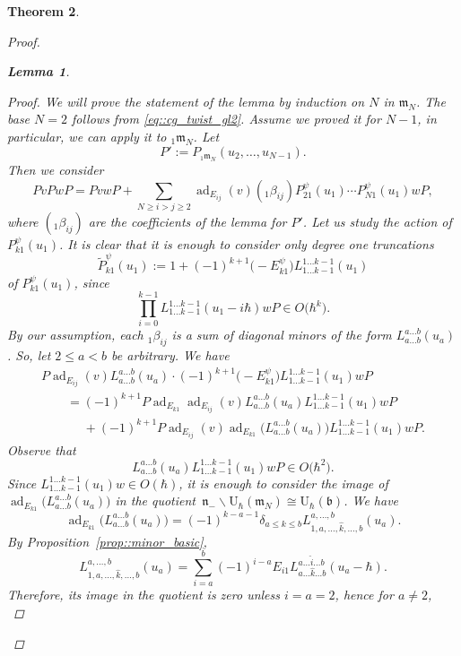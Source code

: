 \documentclass[10pt,a4paper]{amsart}
\numberwithin{equation}{section}
\newtheorem{Theorem}{Theorem}[section]
\newtheorem{Lemma}[Theorem]{Lemma}
\newcommand{\U}{\mathrm{U}_{\hbar}}
\renewcommand{\b}{\mathfrak{b}}
\newcommand{\n}{\mathfrak{n}}
\newcommand{\m}{\mathfrak{m}}
\DeclareMathOperator{\ad}{ad}
\begin{document}
\begin{Theorem}
\begin{proof}
\begin{Lemma}
\begin{proof}
					We will prove the statement of the lemma by induction on $N$ in $\m_N$. The base $N=2$ follows from \eqref{eq::cg_twist_gl2}. Assume we proved it for $N-1$, in particular, we can apply it to ${}_1\m_N$. Let
					\[
					P' := P_{{}_1\m_N} (u_2,\dots, u_{N-1}).
					\]
					Then we consider
					\[
					PvPwP = PvwP + \sum\limits_{N\geq i > j \geq 2} \ad_{E_{ij}}(v) ({}_1\beta_{ij}) P_{21}^{\psi}(u_1) \cdots P_{N1}^{\psi}(u_1) wP,
					\]
					where $({}_1\beta_{ij})$ are the coefficients of the lemma for $P'$. Let us study the action of $P_{k1}^{\psi}(u_1)$. It is clear that it is enough to consider only degree one truncations
					\[
					\tilde{P}_{k1}^{\psi}(u_1) := 1 + (-1)^{k+1} \bigl(-E_{k1}^{\psi}\bigr) L_{1\dots k-1}^{1\dots k-1}(u_1)
					\]
					of $P_{k1}^{\psi}(u_1)$, since
					\[
					\prod_{i=0}^{k-1} L_{1\dots k-1}^{1\dots k-1}(u_1 - i\hbar)wP \in O\bigl(\hbar^k\bigr).
					\]
					By our assumption, each ${}_1\beta_{ij}$ is a sum of diagonal minors of the form $L_{a\dots b}^{a\dots b}(u_a)$. So, let $2 \leq a < b$ be arbitrary. We have
					\begin{gather*}
						P\ad_{E_{ij}}(v) L_{a \dots b}^{a\dots b}(u_a) \cdot (-1)^{k+1} \bigl(-E_{k1}^{\psi}\bigr) L_{1\dots k-1}^{1\dots k-1}(u_1) wP \\
						\qquad= (-1)^{k+1} P \ad_{E_{k1}} \ad_{E_{ij}}(v) L_{a\dots b}^{a\dots b}(u_a) L_{1\dots k-1}^{1\dots k-1}(u_1) wP \\
						\phantom{\qquad=}{}+ (-1)^{k+1} P \ad_{E_{ij}}(v) \ad_{E_{k1}} \bigl(L_{a\dots b}^{a \dots b}(u_a)\bigr) L_{1\dots k-1}^{1\dots k-1}(u_1)wP.
					\end{gather*}
					Observe that
					\[
					L_{a\dots b}^{a\dots b}(u_a) L_{1\dots k-1}^{1\dots k-1}(u_1) wP \in O\bigl(\hbar^2\bigr).
					\]
					Since $L_{1\dots k-1}^{1\dots k-1}(u_1)w \in O(\hbar)$, it is enough to consider the image of $\ad_{E_{k1}}\bigl(L_{a\dots b}^{a\dots b}(u_a)\bigr) $ in the quotient~${\n_- \backslash \U(\m_N) \cong \U(\b)}$.
					We have
					\[
					\ad_{E_{k1}}\bigl(L_{a\dots b}^{a\dots b}(u_a)\bigr) = (-1)^{k-a-1}\delta_{a \leq k \leq b} L_{1,a,\dots,\hat{k},\dots,b}^{a,\dots,b}(u_a).
					\]
					By Proposition~\ref{prop::minor_basic},
					\[
					L_{1,a,\dots,\hat{k},\dots,b}^{a,\dots,b}(u_a) = \sum\limits_{i=a}^b (-1)^{i-a} E_{i1} L_{a\dots \hat{k} \dots b}^{a\dots \hat{i} \dots b}(u_a-\hbar).
					\]
					Therefore, its image in the quotient is zero unless $i=a=2$, hence for $a\not= 2$,
					\begin{equation}
						\label{eq::not_two_no_contribution}

\end{equation}
\end{proof}
\end{Lemma}
\end{proof}
\end{Theorem}
\end{document}
